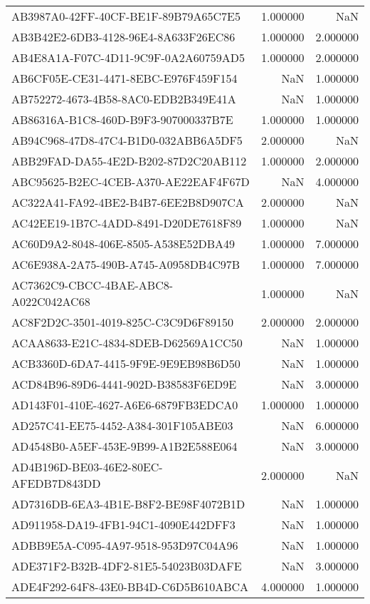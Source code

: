 \begin{tabular}{lrr}
AB3987A0-42FF-40CF-BE1F-89B79A65C7E5 & 1.000000 & NaN \\
AB3B42E2-6DB3-4128-96E4-8A633F26EC86 & 1.000000 & 2.000000 \\
AB4E8A1A-F07C-4D11-9C9F-0A2A60759AD5 & 1.000000 & 2.000000 \\
AB6CF05E-CE31-4471-8EBC-E976F459F154 & NaN & 1.000000 \\
AB752272-4673-4B58-8AC0-EDB2B349E41A & NaN & 1.000000 \\
AB86316A-B1C8-460D-B9F3-907000337B7E & 1.000000 & 1.000000 \\
AB94C968-47D8-47C4-B1D0-032ABB6A5DF5 & 2.000000 & NaN \\
ABB29FAD-DA55-4E2D-B202-87D2C20AB112 & 1.000000 & 2.000000 \\
ABC95625-B2EC-4CEB-A370-AE22EAF4F67D & NaN & 4.000000 \\
AC322A41-FA92-4BE2-B4B7-6EE2B8D907CA & 2.000000 & NaN \\
AC42EE19-1B7C-4ADD-8491-D20DE7618F89 & 1.000000 & NaN \\
AC60D9A2-8048-406E-8505-A538E52DBA49 & 1.000000 & 7.000000 \\
AC6E938A-2A75-490B-A745-A0958DB4C97B & 1.000000 & 7.000000 \\
AC7362C9-CBCC-4BAE-ABC8-A022C042AC68 & 1.000000 & NaN \\
AC8F2D2C-3501-4019-825C-C3C9D6F89150 & 2.000000 & 2.000000 \\
ACAA8633-E21C-4834-8DEB-D62569A1CC50 & NaN & 1.000000 \\
ACB3360D-6DA7-4415-9F9E-9E9EB98B6D50 & NaN & 1.000000 \\
ACD84B96-89D6-4441-902D-B38583F6ED9E & NaN & 3.000000 \\
AD143F01-410E-4627-A6E6-6879FB3EDCA0 & 1.000000 & 1.000000 \\
AD257C41-EE75-4452-A384-301F105ABE03 & NaN & 6.000000 \\
AD4548B0-A5EF-453E-9B99-A1B2E588E064 & NaN & 3.000000 \\
AD4B196D-BE03-46E2-80EC-AFEDB7D843DD & 2.000000 & NaN \\
AD7316DB-6EA3-4B1E-B8F2-BE98F4072B1D & NaN & 1.000000 \\
AD911958-DA19-4FB1-94C1-4090E442DFF3 & NaN & 1.000000 \\
ADBB9E5A-C095-4A97-9518-953D97C04A96 & NaN & 1.000000 \\
ADE371F2-B32B-4DF2-81E5-54023B03DAFE & NaN & 3.000000 \\
ADE4F292-64F8-43E0-BB4D-C6D5B610ABCA & 4.000000 & 1.000000 \\

\end{tabular}
